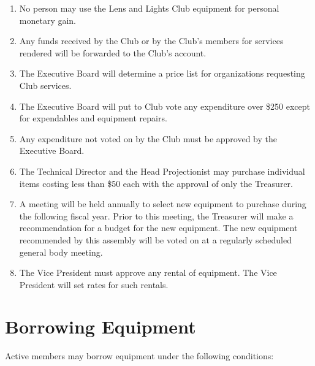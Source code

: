 \documentclass[12pt,letterpaper,oneside]{book}
\begin{document}
\begin{enumerate}

\item No person may use the Lens and Lights Club equipment for personal monetary gain.
\item Any funds received by the Club or by the Club's members for services rendered will be forwarded to the Club's account.
\item The Executive Board will determine a price list for organizations requesting Club services.
\item The Executive Board will put to Club vote any expenditure over \$250 except for expendables and equipment repairs.
\item Any expenditure not voted on by the Club must be approved by the Executive Board.
\item The Technical Director and the Head Projectionist may purchase individual items costing less than \$50 each with the approval of only the Treasurer.
\item A meeting will be held annually to select new equipment to purchase during the following fiscal year. Prior to this meeting, the Treasurer will make a recommendation for a budget for the new equipment. The new equipment recommended by this assembly will be voted on at a regularly scheduled general body meeting.
\item The Vice President must approve any rental of equipment. The Vice President will set rates for such rentals.

\end{enumerate}

\section{Borrowing Equipment}

Active members may borrow equipment under the following conditions:
\end{document}
